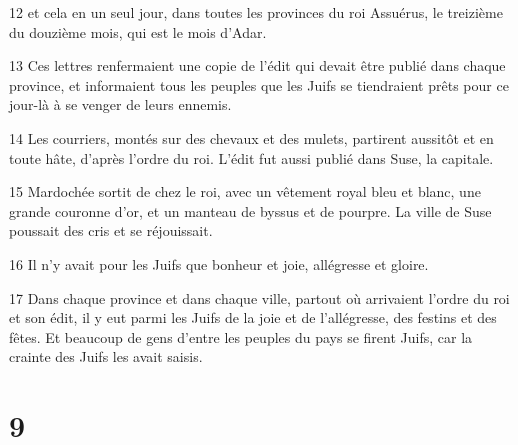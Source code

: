 \par 12 et cela en un seul jour, dans toutes les provinces du roi Assuérus, le treizième du douzième mois, qui est le mois d'Adar.
\par 13 Ces lettres renfermaient une copie de l'édit qui devait être publié dans chaque province, et informaient tous les peuples que les Juifs se tiendraient prêts pour ce jour-là à se venger de leurs ennemis.
\par 14 Les courriers, montés sur des chevaux et des mulets, partirent aussitôt et en toute hâte, d'après l'ordre du roi. L'édit fut aussi publié dans Suse, la capitale.
\par 15 Mardochée sortit de chez le roi, avec un vêtement royal bleu et blanc, une grande couronne d'or, et un manteau de byssus et de pourpre. La ville de Suse poussait des cris et se réjouissait.
\par 16 Il n'y avait pour les Juifs que bonheur et joie, allégresse et gloire.
\par 17 Dans chaque province et dans chaque ville, partout où arrivaient l'ordre du roi et son édit, il y eut parmi les Juifs de la joie et de l'allégresse, des festins et des fêtes. Et beaucoup de gens d'entre les peuples du pays se firent Juifs, car la crainte des Juifs les avait saisis.

\chapter{9}

